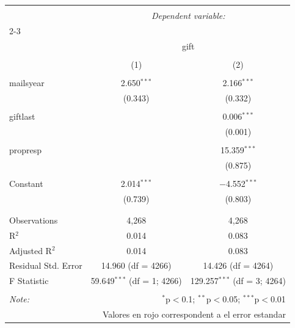 \documentclass[10pt,a4paper]{article}
\begin{document}
\begin{table}[!htbp] \centering 
  \label{} 
\begin{tabular}{@{\extracolsep{5pt}}lcc} 
\\[-1.8ex]\hline 
\hline \\[-1.8ex] 
 & \multicolumn{2}{c}{\textit{Dependent variable:}} \\ 
\cline{2-3} 
\\[-1.8ex] & \multicolumn{2}{c}{gift} \\ 
\\[-1.8ex] & (1) & (2)\\ 
\hline \\[-1.8ex] 
 mailsyear & 2.650$^{***}$ & 2.166$^{***}$ \\ 
  & {\color{red}(0.343)} & {\color{red}(0.332) }\\ 
  & & \\ 
 giftlast &  & 0.006$^{***}$ \\ 
  &  & {\color{red}(0.001)} \\ 
  & & \\ 
 propresp &  & 15.359$^{***}$ \\ 
  &  & {\color{red}(0.875)} \\ 
  & & \\ 
 Constant & 2.014$^{***}$ & $-$4.552$^{***}$ \\ 
  &{\color{red} (0.739) }& {\color{red}(0.803) }\\ 
  & & \\ 
\hline \\[-1.8ex] 
Observations & 4,268 & 4,268 \\ 
R$^{2}$ & 0.014 & 0.083 \\ 
Adjusted R$^{2}$ & 0.014 & 0.083 \\ 
Residual Std. Error & 14.960 (df = 4266) & 14.426 (df = 4264) \\ 
F Statistic & 59.649$^{***}$ (df = 1; 4266) & 129.257$^{***}$ (df = 3; 4264) \\ 
\hline 
\hline \\[-1.8ex] 
\textit{Note:}  & \multicolumn{2}{r}{$^{*}$p$<$0.1; $^{**}$p$<$0.05; $^{***}$p$<$0.01} \\
\textit{}  & \multicolumn{2}{r}{Valores en rojo correspondent a el error estandar}
\end{tabular} 
\end{table} 
\end{document}

